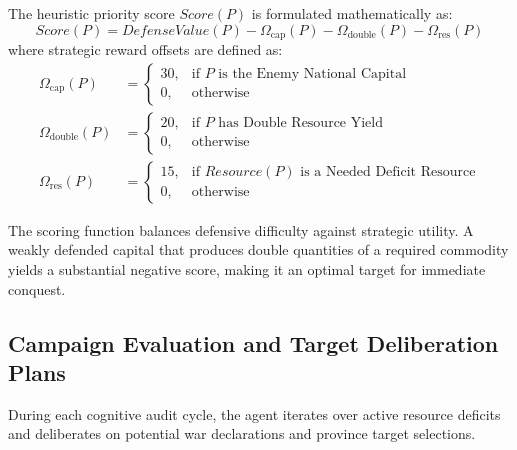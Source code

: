 The heuristic priority score $\mathit{Score}(P)$ is formulated mathematically as:
\begin{equation}
    \label{eq:target_score}
    \mathit{Score}(P) = \mathit{DefenseValue}(P) - \Omega_{\text{cap}}(P) - \Omega_{\text{double}}(P) - \Omega_{\text{res}}(P)
\end{equation}
where strategic reward offsets are defined as:
\begin{align}
    \Omega_{\text{cap}}(P) &= \begin{cases} 30, & \text{if } P \text{ is the Enemy National Capital} \\ 0, & \text{otherwise} \end{cases} \\
    \Omega_{\text{double}}(P) &= \begin{cases} 20, & \text{if } P \text{ has Double Resource Yield} \\ 0, & \text{otherwise} \end{cases} \\
    \Omega_{\text{res}}(P) &= \begin{cases} 15, & \text{if } \mathit{Resource}(P) \text{ is a Needed Deficit Resource} \\ 0, & \text{otherwise} \end{cases}
\end{align}

The scoring function balances defensive difficulty against strategic utility. A weakly defended capital that produces double quantities of a required commodity yields a substantial negative score, making it an optimal target for immediate conquest.

\subsection{Campaign Evaluation and Target Deliberation Plans}
\label{subsec:campaign_plans}

During each cognitive audit cycle, the agent iterates over active resource deficits and deliberates on potential war declarations and province target selections.

